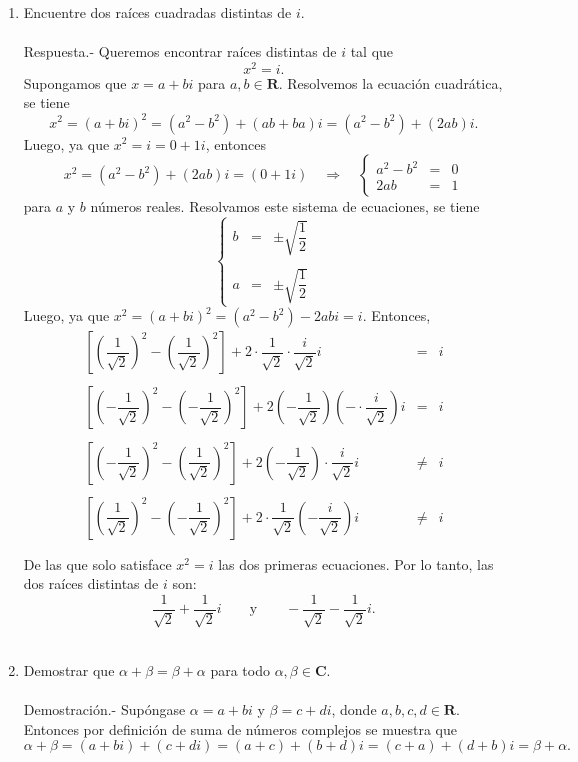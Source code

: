 \begin{enumerate}[\bfseries 1.]
    \item Encuentre dos raíces cuadradas distintas de $i$.\\\\
	Respuesta.-\; Queremos encontrar raíces distintas de $i$ tal que
	$$x^2=i.$$
	Supongamos que $x=a+bi$ para $a,b\in \textbf{R}$. Resolvemos la ecuación cuadrática, se tiene 
	$$x^2=(a+bi)^2=(a^2-b^2)+(ab+ba)i=(a^2-b^2)+(2ab)i.$$
	Luego, ya que $x^2=i=0+1i$, entonces
	$$x^2=(a^2-b^2)+(2ab)i=(0+1i)\quad \Rightarrow \quad \left\{\begin{array}{rcl}
		a^2-b^2&=&0\\
		2ab&=&1
	    \end{array}\right.$$
	para $a$ y $b$ números reales. Resolvamos este sistema de ecuaciones, se tiene 
	$$\left\{\begin{array}{rcl}
		b&=&\pm \sqrt{\dfrac{1}{2}}\\\\
		a&=&\pm \sqrt{\dfrac{1}{2}}
	\end{array}\right.$$
	Luego, ya que $x^2=(a+bi)^2=(a^2-b^2)-2abi=i$. Entonces, 
	$$\begin{array}{rcl}
	    \left[\left(\dfrac{1}{\sqrt{2}}\right)^2-\left(\dfrac{1}{\sqrt{2}}\right)^2\right]+2\cdot\dfrac{1}{\sqrt{2}}\cdot\dfrac{i}{\sqrt{2}}i&=&i\\\\
	    \left[\left(-\dfrac{1}{\sqrt{2}}\right)^2-\left(-\dfrac{1}{\sqrt{2}}\right)^2\right]+2\left(-\dfrac{1}{\sqrt{2}}\right)\left(-\cdot\dfrac{i}{\sqrt{2}}\right)i&=&i\\\\
	    \left[\left(-\dfrac{1}{\sqrt{2}}\right)^2-\left(\dfrac{1}{\sqrt{2}}\right)^2\right]+2\left(-\dfrac{1}{\sqrt{2}}\right)\cdot\dfrac{i}{\sqrt{2}}i&\neq&i\\\\
	    \left[\left(\dfrac{1}{\sqrt{2}}\right)^2-\left(-\dfrac{1}{\sqrt{2}}\right)^2\right]+2\cdot \dfrac{1}{\sqrt{2}}\left(-\dfrac{i}{\sqrt{2}}\right)i&\neq&i\\\\
	\end{array}$$
	De las que solo satisface $x^2=i$ las dos primeras ecuaciones. Por lo tanto, las dos raíces distintas de $i$ son:
	$$\dfrac{1}{\sqrt{2}}+\dfrac{1}{\sqrt{2}}i\qquad \mbox{y}\qquad -\dfrac{1}{\sqrt{2}}-\dfrac{1}{\sqrt{2}}i.$$\\


    \item Demostrar que $\alpha+\beta=\beta+\alpha$ para todo $\alpha,\beta\in \textbf{C}$.\\\\
	Demostración.-\;  Supóngase $\alpha=a+bi$ y $\beta=c+di$, donde $a,b,c,d \in \textbf{R}$. Entonces por definición de suma de números complejos se muestra que
	$$\alpha + \beta = (a+bi) + (c+di) = (a+c) + (b+d)i = (c+a) + (d+b)i = \beta + \alpha.$$\\



\end{enumerate}
